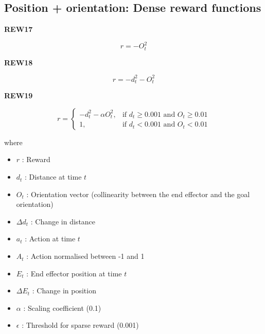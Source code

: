 \documentclass{article}
\newcommand{\norm}[1]{\left\lVert#1\right\rVert}
\begin{document}
\subsection{Position + orientation: Dense reward functions}

\textbf{REW17}

\begin{equation}
r = - O_t^2
\end{equation}

\textbf{REW18}

\begin{equation}
r = - d_t^2 - O_t^2
\end{equation}

\textbf{REW19}

\begin{equation}
r = \begin{cases}
    - d_t^2 - \alpha O_t^2 , & \text{if $d_t \geq 0.001 $ and $O_t \geq 0.01$}\\
    1 , & \text{if $d_t < 0.001 $ and $O_t < 0.01$}
  \end{cases}
\end{equation}



%
%
%


%



where
\begin{itemize}  
\item $r$ : Reward
\item $d_t$ : Distance at time $t$ 
\item $O_t$ : Orientation vector (collinearity between the end effector and the goal orientation)
\item $\Delta d_t$ : Change in distance
\item $a_t$ : Action at time $t$ 
\item $A_t$ : Action normalised between -1 and 1 
\item $E_t$ : End effector position at time $t$
\item $\Delta E_t$ : Change in position
\item $\alpha$ : Scaling coefficient (0.1)
\item $\epsilon$ : Threshold for sparse reward (0.001)
\end{itemize}
\end{document}
